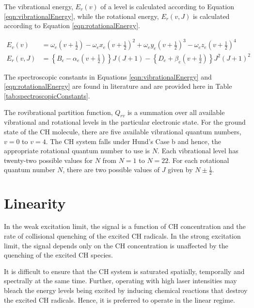 The vibrational energy, \(E_v(v)\) of a level is calculated according to Equation \ref{eqn:vibrationalEnergy}, while the rotational energy, \(E_r(v, J)\) is calculated according to Equation \ref{eqn:rotationalEnergy}.

\begin{align}
  E_v(v) &= \omega_e \left(v+\frac{1}{2}\right) - \omega_ex_e \left(v+\frac{1}{2}\right)^2 + \omega_ey_e \left(v+\frac{1}{2}\right)^3 - \omega_ez_e \left(v+\frac{1}{2}\right)^4
  \label{eqn:vibrationalEnergy}\\
  E_r(v, J) &= \left\{B_e - \alpha_e \left(v+\frac{1}{2}\right)\right\}J(J+1) - \left\{D_e + \beta_e \left(v+\frac{1}{2}\right)\right\}J^2(J+1)^2
  \label{eqn:rotationalEnergy}
\end{align}

The spectroscopic constants in Equations \ref{eqn:vibrationalEnergy} and \ref{eqn:rotationalEnergy} are found in literature\cite{1995-zachwieja} and are provided here in Table \ref{tab:spectroscopicConstants}.



The rovibrational partition function, \(Q_{rv}\) is a summation over all available vibrational and rotational levels in the particular electronic state.
For the ground state of the CH molecule, there are five available vibrational quantum numbers, \(v = 0\) to \(v = 4\).
The CH system falls under Hund's Case b and hence, the appropriate rotational quantum number to use is \(N\).
Each vibrational level has twenty-two possible values for \(N\) from \(N = 1\) to \(N = 22\).
For each rotational quantum number \(N\), there are two possible values of \(J\) given by \(N \pm \frac{1}{2}\).


\section{Linearity}

In the weak excitation limit, the signal is a function of CH concentration and the rate of collisional quenching of the excited CH radicals.
In the strong excitation limit, the signal depends only on the CH concentration is unaffected by the quenching of the excited CH species.

It is difficult to ensure that the CH system is saturated spatially, temporally and spectrally at the same time.
Further, operating with high laser intensities may bleach the energy levels being excited by inducing chemical reactions that destroy the excited CH radicals.
Hence, it is preferred to operate in the linear regime.
